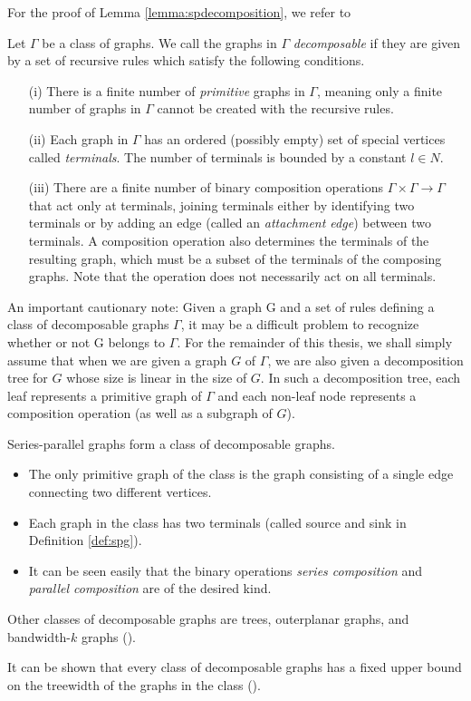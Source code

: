 For the proof of Lemma \ref{lemma:spdecomposition}, we refer to \cite{VJT79}

\begin{definition}
	\label{def:decompgraphs}
	Let $\Gamma$ be a class of graphs. We call the graphs in $\Gamma$ \textit{decomposable} if they are given by a set of recursive rules which satisfy the following conditions.
	\begin{itemize}
  		\item[(i)] There is a finite number of \textit{primitive} graphs in $\Gamma$, meaning only a finite number of graphs in $\Gamma$ cannot be created with the recursive rules.
  		\item[(ii)] Each graph in $\Gamma$ has an ordered (possibly empty) set of special vertices called \textit{terminals}. The number of terminals is bounded by a constant $l \in N$.
  		\item[(iii)] There are a finite number of binary composition operations $\Gamma \times \Gamma \to \Gamma$ that act only at terminals, joining terminals either by identifying two terminals or by adding an edge (called an \textit{attachment edge}) between two terminals. A
  		composition operation also determines the terminals of the resulting graph, which must be a subset of the terminals of the composing graphs. Note that the operation does not necessarily act on all terminals.
	\end{itemize}
\end{definition}

An important cautionary note: Given a graph G and a set of rules defining a class of decomposable graphs $\Gamma$, it may be a difficult problem to recognize whether or not G belongs to $\Gamma$. For the remainder of this thesis, we shall simply assume that when we are given a graph $G$ of $\Gamma$, we are also given a decomposition tree for $G$ whose size is linear in the size of $G$. In such a decomposition tree, each leaf represents a primitive graph of $\Gamma$ and each non-leaf node represents a composition operation (as well as a subgraph of $G$).

\begin{remark}
	\label{rem:spgdecomp}
	Series-parallel graphs form a class of decomposable graphs.
	\begin{itemize}
		\item The only primitive graph of the class is the graph consisting of a single edge connecting
		two different vertices.
		\item Each graph in the class has two terminals (called source and sink in Definition \ref{def:spg}).
		\item It can be seen easily that the binary operations \textit{series composition} and \textit{parallel composition}
		are of the desired kind.
	\end{itemize}
\end{remark}

Other classes of decomposable graphs are trees, outerplanar graphs, and bandwidth-$k$ graphs (\cite{BLW87}).\medskip

It can be shown that every class of decomposable graphs has a fixed upper bound on the treewidth of the graphs in the class (\cite{Wimer87}).

